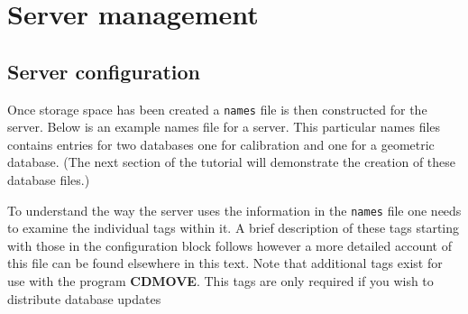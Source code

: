 \section{Server management}
\subsection{Server configuration}
Once storage space has been created a {\tt names} file is then constructed for the server.
Below is an example names file for a server.
This particular names files contains entries for two databases
one for calibration and one for a geometric database.
(The next section of the tutorial will demonstrate the creation of these database files.)
\par
{}
\par
To understand the way the server uses the information in the {\tt names}
file one needs to examine the individual tags within it.
A brief description of these tags starting with those in the configuration block
follows however a more detailed account of this file can be found elsewhere in
this text.
Note that additional tags exist for use with the program {\bf CDMOVE}.
This tags are only required if you wish to distribute database updates
